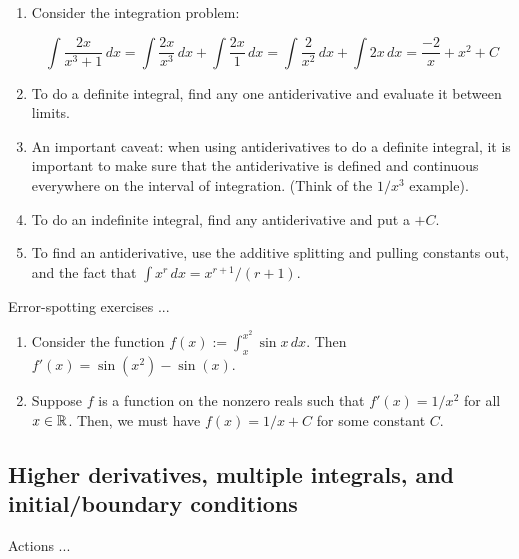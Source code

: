 \documentclass[10pt]{amsart}
\begin{document}
\begin{enumerate}
\item Consider the integration problem:

  $$\int \frac{2x}{x^3 + 1} \, dx = \int \frac{2x}{x^3} \, dx + \int \frac{2x}{1} \, dx = \int \frac{2}{x^2} \, dx + \int 2x \, dx = \frac{-2}{x} + x^2 + C$$
\item To do a definite integral, find any one antiderivative and
  evaluate it between limits.
\item An important caveat: when using antiderivatives to do a definite
  integral, it is important to make sure that the antiderivative is
  defined and continuous everywhere on the interval of
  integration. (Think of the $1/x^3$ example). 
\item To do an indefinite integral, find any antiderivative and put a
  $+ C$.
\item To find an antiderivative, use the additive splitting and
  pulling constants out, and the fact that $\int x^r \, dx = x^{r +
    1}/(r + 1)$.
\end{enumerate}

Error-spotting exercises ...

\begin{enumerate}
\item Consider the function $f(x) := \int_x^{x^2} \sin x \, dx$. Then
  $f'(x) = \sin(x^2) - \sin(x)$.
\item Suppose $f$ is a function on the nonzero reals such that $f'(x)
  = 1/x^2$ for all $x \in \mathbb{R}$. Then, we must have $f(x) = 1/x + C$ for
  some constant $C$.
\end{enumerate}

\subsection{Higher derivatives, multiple integrals, and initial/boundary conditions}

Actions ...
\end{document}
